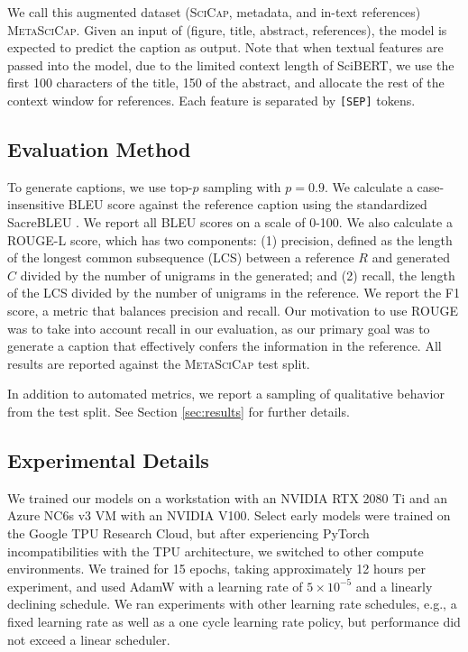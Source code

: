 \documentclass{article}
\newcommand{\msc}{\textsc{MetaSciCap}\xspace}
\newcommand{\scicap}{\textsc{SciCap}\xspace}
\begin{document}
We call this augmented dataset (\scicap, metadata, and in-text references) \msc. Given an input of (figure, title, abstract, references), the model is expected to predict the caption as output. Note that when textual features are passed into the model, due to the limited context length of SciBERT, we use the first 100 characters of the title, 150 of the abstract, and allocate the rest of the context window for references. Each feature is separated by \texttt{[SEP]} tokens.

\subsection{Evaluation Method}

To generate captions, we use top-$p$ sampling with $p = 0.9$. We calculate a case-insensitive BLEU score against the reference caption using the standardized SacreBLEU \citep{post-2018-call}. We report all BLEU scores on a scale of 0-100. We also calculate a ROUGE-L score, which has two components: (1) precision, defined as the length of the longest common subsequence (LCS) between a reference $R$ and generated $C$ divided by the number of unigrams in the generated; and (2) recall, the length of the LCS divided by the number of unigrams in the reference. We report the F1 score, a metric that balances precision and recall. Our motivation to use ROUGE was to take into account recall in our evaluation, as our primary goal was to generate a caption that effectively confers the information in the reference. All results are reported against the \msc test split.

In addition to automated metrics, we report a sampling of qualitative behavior from the test split. See Section \ref{sec:results} for further details.

\subsection{Experimental Details}

We trained our models on a workstation with an NVIDIA RTX 2080 Ti and an Azure NC6s v3 VM with an NVIDIA V100. Select early models were trained on the Google TPU Research Cloud, but after experiencing PyTorch incompatibilities with the TPU architecture, we switched to other compute environments. We trained for 15 epochs, taking approximately 12 hours per experiment, and used AdamW with a learning rate of $5\times 10^{-5}$ and a linearly declining schedule. We ran experiments with other learning rate schedules, e.g., a fixed learning rate as well as a one cycle learning rate policy, but performance did not exceed a linear scheduler.
\end{document}
